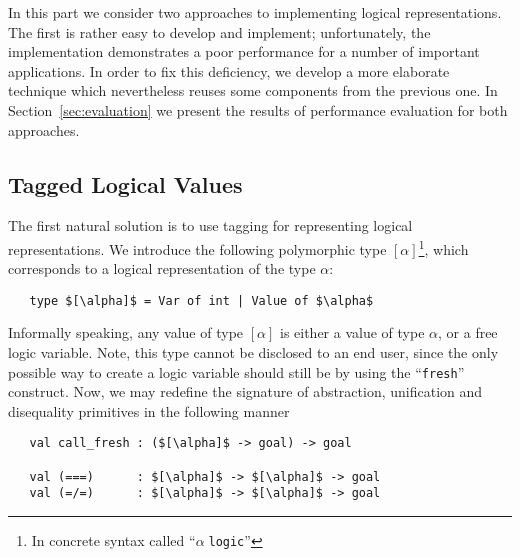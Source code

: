 
In this part we consider two approaches to implementing logical representations.  The first is rather easy to 
develop and implement; unfortunately, the implementation demonstrates a poor performance for a number of 
important applications. In order to fix this deficiency, we develop a more elaborate technique which 
nevertheless reuses some components from the previous one. In Section~\ref{sec:evaluation}
we present the results of performance evaluation for both approaches.

\subsection{Tagged Logical Values}

The first natural solution is to use tagging for representing logical representations.
We introduce the following polymorphic type $[\alpha]$\footnote{In concrete syntax called ``$\alpha\;$\lstinline{logic}''}, which corresponds to a logical representation of the type $\alpha$:

\begin{lstlisting}
   type $[\alpha]$ = Var of int | Value of $\alpha$
\end{lstlisting}

Informally speaking, any value of type $[\alpha]$ is either a value of type $\alpha$, or a free
logic variable. Note, this type cannot be disclosed to an end user, since the only possible way to create a logic variable should still be by using the ``\lstinline{fresh}'' construct.
Now, we may redefine the signature of abstraction, unification and disequality primitives in the
following manner

\begin{lstlisting}
   val call_fresh : ($[\alpha]$ -> goal) -> goal

   val (===)      : $[\alpha]$ -> $[\alpha]$ -> goal
   val (=/=)      : $[\alpha]$ -> $[\alpha]$ -> goal
\end{lstlisting}

